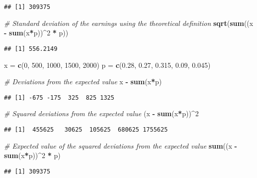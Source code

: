 \documentclass[
]{article}
\newenvironment{Shaded}{\begin{snugshade}}{\end{snugshade}}
\newcommand{\CommentTok}[1]{\textcolor[rgb]{0.56,0.35,0.01}{\textit{#1}}}
\newcommand{\DecValTok}[1]{\textcolor[rgb]{0.00,0.00,0.81}{#1}}
\newcommand{\FloatTok}[1]{\textcolor[rgb]{0.00,0.00,0.81}{#1}}
\newcommand{\FunctionTok}[1]{\textcolor[rgb]{0.13,0.29,0.53}{\textbf{#1}}}
\newcommand{\NormalTok}[1]{#1}
\newcommand{\OtherTok}[1]{\textcolor[rgb]{0.56,0.35,0.01}{#1}}
\newcommand{\SpecialCharTok}[1]{\textcolor[rgb]{0.81,0.36,0.00}{\textbf{#1}}}
\begin{document}
\begin{verbatim}
## [1] 309375
\end{verbatim}

\begin{Shaded}
\begin{Highlighting}[]
\CommentTok{\# Standard deviation of the earnings using the theoretical definition}
\FunctionTok{sqrt}\NormalTok{(}\FunctionTok{sum}\NormalTok{((x }\SpecialCharTok{{-}} \FunctionTok{sum}\NormalTok{(x}\SpecialCharTok{*}\NormalTok{p))}\SpecialCharTok{\^{}}\DecValTok{2} \SpecialCharTok{*}\NormalTok{ p))}
\end{Highlighting}
\end{Shaded}

\begin{verbatim}
## [1] 556.2149
\end{verbatim}

\begin{Shaded}
\begin{Highlighting}[]
\NormalTok{x }\OtherTok{=} \FunctionTok{c}\NormalTok{(}\DecValTok{0}\NormalTok{, }\DecValTok{500}\NormalTok{, }\DecValTok{1000}\NormalTok{, }\DecValTok{1500}\NormalTok{, }\DecValTok{2000}\NormalTok{)}
\NormalTok{p }\OtherTok{=} \FunctionTok{c}\NormalTok{(}\FloatTok{0.28}\NormalTok{, }\FloatTok{0.27}\NormalTok{, }\FloatTok{0.315}\NormalTok{, }\FloatTok{0.09}\NormalTok{, }\FloatTok{0.045}\NormalTok{)}

\CommentTok{\# Deviations from the expected value}
\NormalTok{x }\SpecialCharTok{{-}} \FunctionTok{sum}\NormalTok{(x}\SpecialCharTok{*}\NormalTok{p)}
\end{Highlighting}
\end{Shaded}

\begin{verbatim}
## [1] -675 -175  325  825 1325
\end{verbatim}

\begin{Shaded}
\begin{Highlighting}[]
\CommentTok{\# Squared deviations from the expected value}
\NormalTok{(x }\SpecialCharTok{{-}} \FunctionTok{sum}\NormalTok{(x}\SpecialCharTok{*}\NormalTok{p))}\SpecialCharTok{\^{}}\DecValTok{2}
\end{Highlighting}
\end{Shaded}

\begin{verbatim}
## [1]  455625   30625  105625  680625 1755625
\end{verbatim}

\begin{Shaded}
\begin{Highlighting}[]
\CommentTok{\# Expected value of the squared deviations from the expected value}
\FunctionTok{sum}\NormalTok{((x }\SpecialCharTok{{-}} \FunctionTok{sum}\NormalTok{(x}\SpecialCharTok{*}\NormalTok{p))}\SpecialCharTok{\^{}}\DecValTok{2} \SpecialCharTok{*}\NormalTok{ p)}
\end{Highlighting}
\end{Shaded}

\begin{verbatim}
## [1] 309375
\end{verbatim}
\end{document}
